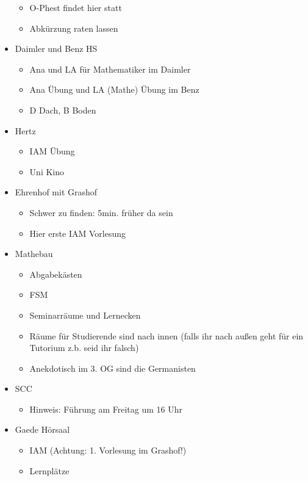 \documentclass[10pt,ngerman]{scrartcl}
\begin{document}
\begin{multicols}{2}
\begin{itemize}
\begin{itemize}
            \item O-Phest findet hier statt
            \item Abkürzung raten lassen
        \end{itemize}
    \item Daimler und Benz HS
        \begin{itemize}
            \item Ana und LA für Mathematiker im Daimler
            \item Ana Übung und LA (Mathe) Übung im Benz
            \item D Dach, B Boden
        \end{itemize}
    \item Hertz
        \begin{itemize}
            \item IAM Übung
            \item Uni Kino
        \end{itemize}
    \item Ehrenhof mit Grashof
        \begin{itemize}
            \item Schwer zu finden: 5min. früher da sein
            \item Hier erste IAM Vorlesung
        \end{itemize}
    \item Mathebau
        \begin{itemize}
            \item Abgabekästen
            \item FSM
            \item Seminarräume und Lernecken
            \item Räume für Studierende sind nach innen (falls ihr nach außen geht für
                ein Tutorium z.b. seid ihr falsch)
            \item Anekdotisch im 3. OG sind die Germanisten
        \end{itemize}
    \item SCC
        \begin{itemize}
            \item Hinweis: Führung am Freitag um 16 Uhr
        \end{itemize}
    \item Gaede Hörsaal
        \begin{itemize}
            \item IAM (Achtung: 1. Vorlesung im Grashof!)
            \item Lernplätze

\end{itemize}
\end{itemize}
\end{multicols}
\end{document}
